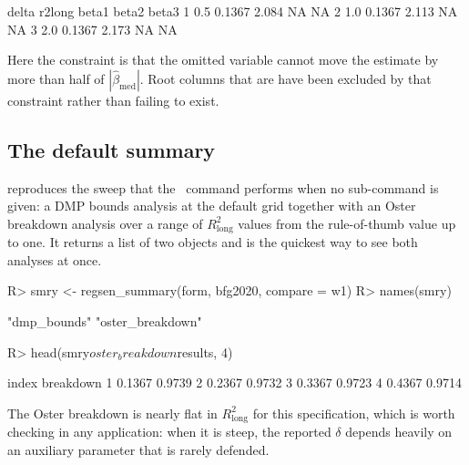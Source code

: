 \documentclass[article]{jss}\usepackage[]{graphicx}\usepackage[]{xcolor}
\newcommand{\Stata}{\proglang{Stata}}
\newcommand{\bmed}{\beta_{\mathrm{med}}}
\begin{document}
\begin{Schunk}
\begin{Soutput}
  delta r2long beta1 beta2 beta3
1   0.5 0.1367 2.084    NA    NA
2   1.0 0.1367 2.113    NA    NA
3   2.0 0.1367 2.173    NA    NA
\end{Soutput}
\end{Schunk}

Here the constraint is that the omitted variable cannot move the estimate
by more than half of $|\hat\bmed|$. Root columns that are  have
been excluded by that constraint rather than failing to exist.

\subsection{The default summary}\label{sec:api-summary}

 reproduces the sweep that the \Stata\ command
performs when no sub-command is given: a DMP bounds analysis at the
default grid together with an Oster breakdown analysis over a range of
$R^2_{}$ values from the rule-of-thumb value up to one. It
returns a list of two  objects and is the quickest
way to see both analyses at once.

\begin{Schunk}
\begin{Sinput}
R> smry <- regsen_summary(form, bfg2020, compare = w1)
R> names(smry)
\end{Sinput}
\begin{Soutput}
[1] "dmp_bounds"      "oster_breakdown"
\end{Soutput}
\begin{Sinput}
R> head(smry$oster_breakdown$results, 4)
\end{Sinput}
\begin{Soutput}
   index breakdown
1 0.1367    0.9739
2 0.2367    0.9732
3 0.3367    0.9723
4 0.4367    0.9714
\end{Soutput}
\end{Schunk}

The Oster breakdown is nearly flat in $R^2_{}$ for this
specification, which is worth checking in any application: when it is
steep, the reported $\delta$ depends heavily on an auxiliary parameter
that is rarely defended.
\end{document}
